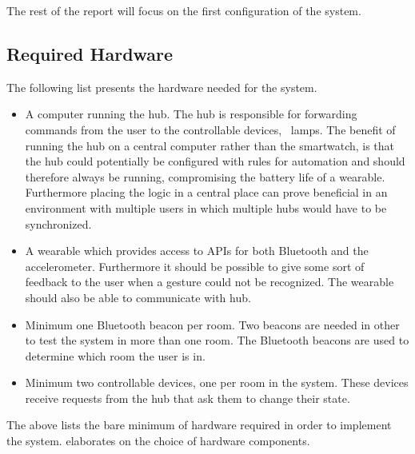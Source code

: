 The rest of the report will focus on the first configuration of the system.

\subsection{Required Hardware}
\label{sec:analysis:system-components:required-hardware}

The following list presents the hardware needed for the system.

\begin{itemize}
\item A computer running the hub. The hub is responsible for forwarding commands from the user to the controllable devices, \eg~lamps. The benefit of running the hub on a central computer rather than the smartwatch, is that the hub could potentially be configured with rules for automation and should therefore always be running, compromising the battery life of a wearable. Furthermore placing the logic in a central place can prove beneficial in an environment with multiple users in which multiple hubs would have to be synchronized.
\item A wearable which provides access to APIs for both Bluetooth and the accelerometer. Furthermore it should be possible to give some sort of feedback to the user when a gesture could not be recognized. The wearable should also be able to communicate with hub.
\item Minimum one Bluetooth beacon per room. Two beacons are needed in other to test the system in more than one room. The Bluetooth beacons are used to determine which room the user is in.
\item Minimum two controllable devices, one per room in the system. These devices receive requests from the hub that ask them to change their state.
\end{itemize}

The above lists the bare minimum of hardware required in order to implement the system.  elaborates on the choice of hardware components.




